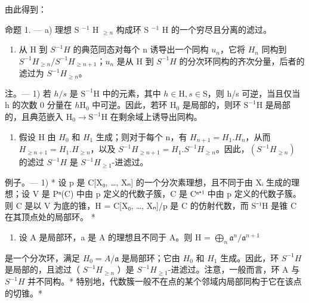 由此得到：

命题 1. --- a) 理想 S \(^{-1}\) H \(_{≥n}\) 构成环 S \(^{-1}\) H 的一个穷尽且分离的滤过。

\begin{enumerate}
\def\labelenumi{\alph{enumi})}
\setcounter{enumi}{1}
\tightlist
\item
  从 H 到 \(S^{-1}H\) 的典范同态对每个 n 诱导出一个同构 \(u_{n}\)，它将 \(H_{n}\) 同构到 \(S^{-1}H_{\geqslant n}/S^{-1}H_{\geqslant n+1}\)；\(u_{n}\) 是从 H 到 \(S^{-1}H\) 的分次环同构的齐次分量，后者的滤过为 \(S^{-1}H_{\geqslant n}\)。
\end{enumerate}

注。--- 1) 若 \(h/s\) 是 \(\mathrm{S}^{-1}\mathrm{H}\) 中的元素，其中 \(h\in\mathrm{H}, s\in\mathrm{S}\)，则 h/s 可逆，当且仅当 h 的次数 0 分量在 \(h\)\(\mathrm{H}_{0}\) 中可逆。因此，若环 \(\mathrm{H}_{0}\) 是局部的，则环 \(\mathrm{S}^{-1}\mathrm{H}\) 是局部的，且典范嵌入 \(\mathrm{H}_{0}\to\mathrm{S}^{-1}\mathrm{H}\) 在剩余域上诱导出同构。

\begin{enumerate}
\def\labelenumi{\arabic{enumi})}
\setcounter{enumi}{1}
\tightlist
\item
  假设 H 由 \(H_{0}\) 和 \(H_{1}\) 生成；则对于每个 n，有 \(H_{n+1} = H_{1}.H_{n}\)，从而 \(H_{\geqslant n+1} = H_{1}.H_{\geqslant n}\)，以及 \(S^{-1}H_{\geqslant n+1} = H_{1}.S^{-1}H_{\geqslant n}\)。因此，\((S^{-1}H_{\geqslant n})\) 的滤过 \(S^{-1}H\) 是 \(S^{-1}H_{\geqslant 1}\)-进滤过。
\end{enumerate}

例子。--- 1) * 设 p 是 C{[}X₀, \ldots, Xₙ{]} 的一个分次素理想，且不同于由 Xᵢ 生成的理想；设 V 是 Pⁿ(C) 中由 p 定义的代数子簇，C 是 Cⁿ⁺¹ 中由 p 定义的代数子簇。则 C 是以 V 为底的锥，H = C{[}X₀, \ldots, Xₙ{]}/p 是 C 的仿射代数，而 S⁻¹H 是锥 C 在其顶点处的局部环。 *

\begin{enumerate}
\def\labelenumi{\arabic{enumi})}
\setcounter{enumi}{1}
\tightlist
\item
  设 A 是局部环，a 是 A 的理想且不同于 A。则 H = \(\bigoplus_{n} \mathfrak{a}^{n}/\mathfrak{a}^{n+1}\)
\end{enumerate}

是一个分次环，满足 \(H_{0} = A/\mathfrak{a}\) 是局部环；它由 \(H_{0}\) 和 \(H_{1}\) 生成。因此，环 \(S^{-1}H\) 是局部的，且滤过（ \(S^{-1}H_{\geq n}\) ）是 \(S^{-1}H_{\geq 1}\)-进滤过。注意，一般而言，环 A 与 \(S^{-1}H\) 并不同构。* 特别地，代数簇一般不在点的某个邻域内局部同构于它在该点的切锥。*


